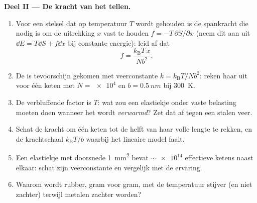 \begin{problem}
\medskip\noindent\textbf{Deel II --- De kracht van het tellen.}
\begin{enumerate}[resume]
  \item Voor een stelsel dat op temperatuur $T$ wordt gehouden is de
        spankracht die nodig is om de uitrekking $x$ vast te houden $f = -T\,\partial S/\partial x$ (neem dit aan uit $\dd E = T\dd S + f\dd x$ bij constante energie): leid af dat
        \[
        f = \frac{k_{\text{B}}T\,x}{Nb^2} .
        \]
  \item De  is tevoorschijn gekomen met veerconstante $k =
        k_{\text{B}}T/Nb^2$: reken haar uit voor één keten met $N =
        \num{e4}$ en $b = \qty{0.5}{nm}$ bij \qty{300}{K}.
  \item De verbluffende factor is $T$: wat zou een elastiekje onder vaste
        belasting moeten doen wanneer het wordt \emph{verwarmd}? Zet dat
        af tegen een stalen veer.
  \item Schat de kracht om één keten tot de helft van haar volle lengte te
        rekken, en de krachtschaal $k_{\text{B}}T/b$ waarbij het lineaire
        model faalt.
  \item Een elastiekje met doorsnede \qty{1}{mm^2} bevat $\sim\num{e14}$
        effectieve ketens naast elkaar: schat zijn veerconstante en
        vergelijk met de ervaring.
  \item Waarom wordt rubber, gram voor gram, met de temperatuur stijver
        (en niet zachter) terwijl metalen zachter worden?
\end{enumerate}


\end{problem}
